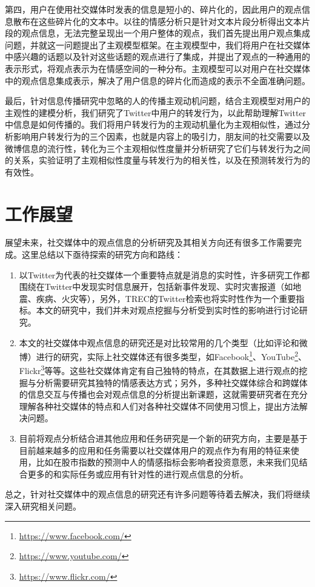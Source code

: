 第四，用户在使用社交媒体时发表的信息是短小的、碎片化的，因此用户的观点信息散布在这些碎片化的文本中。以往的情感分析只是针对文本片段分析得出文本片段的观点信息，无法完整呈现出一个用户整体的观点，我们首先提出用户观点集成问题，并就这一问题提出了主观模型框架。在主观模型中，我们将用户在社交媒体中感兴趣的话题以及针对这些话题的观点进行了集成，并提出了观点的一种通用的表示形式，将观点表示为在情感空间的一种分布。主观模型可以对用户在社交媒体中的观点信息集成表示，解决了用户信息的碎片化而造成的表示不全面准确问题。

最后，针对信息传播研究中忽略的人的传播主观动机问题，结合主观模型对用户的主观性的建模分析，我们研究了Twitter中用户的转发行为，以此帮助理解Twitter中信息是如何传播的。我们将用户转发行为的主观动机量化为主观相似性，通过分析影响用户转发行为的三个因素，也就是内容上的吸引力，朋友间的社交需要以及微博信息的流行性，转化为三个主观相似性度量并分析研究了它们与转发行为之间的关系，实验证明了主观相似性度量与转发行为的相关性，以及在预测转发行为的有效性。

\section{工作展望}
展望未来，社交媒体中的观点信息的分析研究及其相关方向还有很多工作需要完成。这里总结以下亟待探索的研究方向和路线：
  \begin{enumerate}
  \item 以Twitter为代表的社交媒体一个重要特点就是消息的实时性，许多研究工作都围绕在Twitter中发现实时信息展开，包括新事件发现、实时灾害报道（如地震、疾病、火灾等），另外，TREC的Twitter检索也将实时性作为一个重要指标。本文的研究中，我们并未对观点挖掘与分析受到实时性的影响进行讨论研究。
  
 \item 本文的社交媒体中观点信息的研究还是对比较常用的几个类型（比如评论和微博）进行的研究，实际上社交媒体还有很多类型，如Facebook\footnote{\url{https://www.facebook.com/}}、YouTube\footnote{\url{https://www.youtube.com/}}、 Flickr\footnote{\url{https://www.flickr.com/}}等等。这些社交媒体肯定有自己独特的特点，在其数据上进行观点的挖掘与分析需要研究其独特的情感表达方式；另外，多种社交媒体综合和跨媒体的信息交互与传播也会对观点信息的分析提出新课题，这就需要研究者在充分理解各种社交媒体的特点和人们对各种社交媒体不同使用习惯上，提出方法解决问题。
 
 \item 目前将观点分析结合进其他应用和任务研究是一个新的研究方向，主要是基于目前越来越多的应用和任务需要以社交媒体用户的观点作为有用的特征来使用，比如在股市指数的预测中人的情感指标会影响者投资意愿，未来我们见结合更多的和实际任务或应用有针对性的进行观点信息的分析。 
  \end{enumerate}
  
  总之，针对社交媒体中的观点信息的研究还有许多问题等待着去解决，我们将继续深入研究相关问题。

